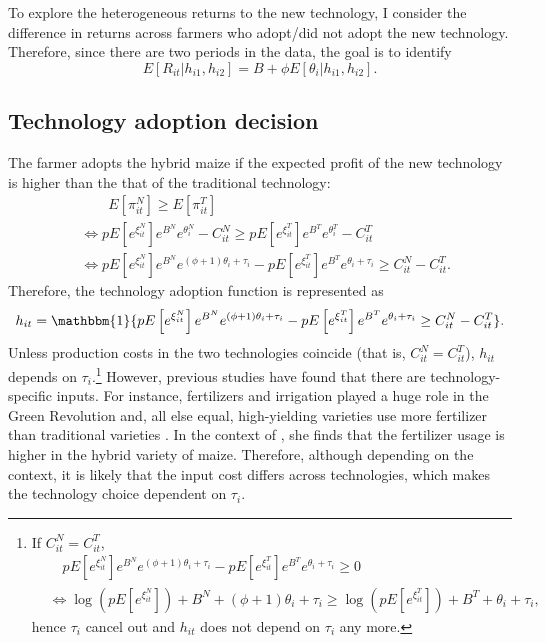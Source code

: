 \documentclass[11pt,letterpaper]{article}
\begin{document}
To explore the heterogeneous returns to the new technology, I consider the difference in returns across farmers who adopt/did not adopt the new technology.
Therefore, since there are two periods in the data, the goal is to identify
\begin{equation*}
  E[R_{it} | h_{i1}, h_{i2}] = B + \phi E[\theta_i | h_{i1}, h_{i2}].
\end{equation*}

\subsection{Technology adoption decision}

The farmer adopts the hybrid maize if the expected profit of the new technology is higher than the that of the traditional technology:
\begin{align*}
  &\qquad E[\pi_{it}^N] \ge E[\pi_{it}^T] \\
  &\Leftrightarrow p E\left[e^{\xi_{it}^N} \right] e^{B^N} e^{\theta_i^N}  - C_{it}^N \ge p E\left[e^{\xi_{it}^T} \right] e^{B^T} e^{\theta_i^T} - C_{it}^T \\
  &\Leftrightarrow p E\left[e^{\xi_{it}^N} \right] e^{B^N} e^{(\phi + 1) \theta_i + \tau_i} - p E\left[e^{\xi_{it}^T} \right] e^{B^T} e^{\theta_i + \tau_i} \ge C_{it}^N - C_{it}^T.
\end{align*}
Therefore, the technology adoption function is represented as 
\begin{equation}\label{eq:adoption}
  h_{it} = \mathbbm{1}\{p E\left[e^{\xi_{it}^N} \right] e^{B^N} e^{(\phi + 1) \theta_i + \tau_i} - p E\left[e^{\xi_{it}^T} \right] e^{B^T} e^{\theta_i + \tau_i} \ge C_{it}^N - C_{it}^T\}.
\end{equation}
Unless production costs in the two technologies coincide (that is, $C_{it}^N = C_{it}^T$), $h_{it}$ depends on $\tau_i$.\footnote{
  If $C_{it}^N = C_{it}^T$,
  \begin{align*}
    &\quad p E\left[e^{\xi_{it}^N} \right] e^{B^N} e^{(\phi + 1) \theta_i + \tau_i} - p E\left[e^{\xi_{it}^T} \right] e^{B^T} e^{\theta_i + \tau_i} \ge 0 \\
    &\Leftrightarrow \log \left(p E\left[e^{\xi_{it}^N} \right] \right) + B^N + (\phi + 1) \theta_i + \tau_i \ge \log \left( p E\left[e^{\xi_{it}^T} \right] \right) + B^T + \theta_i + \tau_i,
  \end{align*}
  hence $\tau_i$ cancel out and $h_{it}$ does not depend on $\tau_i$ any more.
}
However, previous studies have found that there are technology-specific inputs.
For instance, fertilizers and irrigation played a huge role in the Green Revolution and, all else equal, high-yielding varieties use more fertilizer than traditional varieties \citep{heisey2007fertilizers}.
In the context of \citet{Suri11}, she finds that the fertilizer usage is higher in the hybrid variety of maize.
Therefore, although depending on the context, it is likely that the input cost differs across technologies, which makes the technology choice dependent on $\tau_i$.
\end{document}
